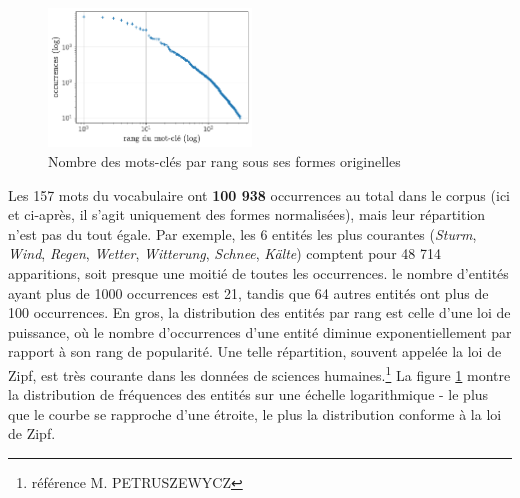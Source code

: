 \documentclass[a4paper,twoside,12pt]{article}
\begin{document}
\begin{figure}
  \begin{center}
    \includegraphics[width=0.48\textwidth]{images/zipf.pdf}
  \end{center}
  \vspace*{-2ex}
  \captionsetup{justification=centering}
  \caption{Nombre des mots-clés par rang sous ses formes originelles}
  \label{fig:zipf}
\end{figure}


Les 157 mots du vocabulaire ont \textbf{100 938} occurrences au total dans le corpus (ici et ci-après, il s'agit uniquement des formes normalisées), mais leur répartition n'est pas du tout égale. Par exemple, les 6 entités les plus courantes (\textit{Sturm}, \textit{Wind}, \textit{Regen}, \textit{Wetter}, \textit{Witterung}, \textit{Schnee}, \textit{Kälte}) comptent pour 48 714 apparitions, soit presque une moitié de toutes les occurrences. le nombre d'entités ayant plus de 1000 occurrences est 21, tandis que 64 autres entités ont plus de 100 occurrences. En gros, la distribution des entités par rang est celle d'une loi de puissance, où le nombre d'occurrences d'une entité diminue exponentiellement par rapport à son rang de popularité. Une telle répartition, souvent appelée la loi de Zipf, est très courante dans les données de sciences humaines.\footnote{référence M. PETRUSZEWYCZ} La figure \ref{fig:zipf} montre la distribution de fréquences des entités sur une échelle logarithmique - le plus que le courbe se rapproche d'une étroite, le plus la distribution conforme à la loi de Zipf.
\end{document}
